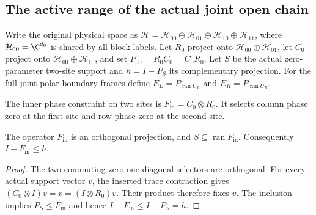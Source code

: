 
\subsection{The active range of the actual joint open chain}
\label{sec:mpo_joint_open_sector_penalty}

Write the original physical space as
$\mathcal H=\mathcal H_{00}\oplus\mathcal H_{01}
    \oplus\mathcal H_{10}\oplus\mathcal H_{11}$, where
$\mathcal H_{00}=\C^{d_0}$ is shared by all block labels.
Let $R_0$ project onto $\mathcal H_{00}\oplus\mathcal H_{01}$,
let $C_0$ project onto $\mathcal H_{00}\oplus\mathcal H_{10}$,
and set $P_{00}=R_0C_0=C_0R_0$. Let $S$ be the actual zero-parameter
two-site support and $h=I-P_S$ its complementary projection.
For the full joint polar boundary frames define
$E_L=P_{\operatorname{ran}U_L}$ and
$E_R=P_{\operatorname{ran}U_R}$.

\begin{definition}
    \label{def:mpo_joint_inner_projection}
    The inner phase constraint on two sites is $F_{\mathrm{in}}=C_0\otimes R_0$.
    It selects column phase zero at the first site and row phase zero
    at the second site.
\end{definition}

\begin{theorem}
    \label{thm:mpo_joint_inner_projection_support}
    The operator $F_{\mathrm{in}}$ is an orthogonal projection, and
    $S\subseteq\operatorname{ran}F_{\mathrm{in}}$. Consequently
    $I-F_{\mathrm{in}}\le h$.
\end{theorem}
\begin{proof}
    The two commuting zero-one diagonal selectors are orthogonal.
    For every actual support vector $v$, the inserted trace contraction
    gives $(C_0\otimes I)v=v=(I\otimes R_0)v$. Their product therefore
    fixes $v$. The inclusion implies $P_S\le F_{\mathrm{in}}$ and
    hence $I-F_{\mathrm{in}}\le I-P_S=h$.
\end{proof}

